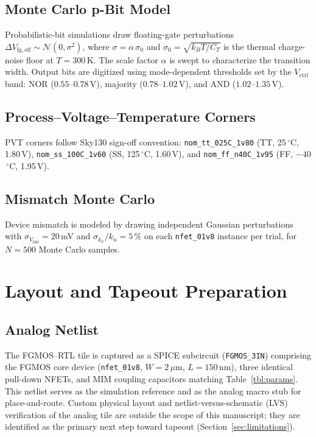\documentclass[a4paper,fleqn]{cas-sc}
\newcommand{\Vfgeff}{V_{\mathrm{fg,eff}}}
\newcommand{\Vctrl}{V_{\mathrm{ctrl}}}
\newcommand{\Vth}{V_{\mathrm{th0}}}
\newcommand{\kn}{k_{n}}
\newcommand{\CT}{C_{T}}
\begin{document}
\subsection{Monte Carlo p-Bit Model}

Probabilistic-bit simulations draw floating-gate perturbations
$\Delta\Vfgeff \sim \mathcal{N}(0,\sigma^2)$, where $\sigma = \alpha\,\sigma_0$ and
$\sigma_0 = \sqrt{k_B T / \CT}$ is the thermal charge-noise floor at $T = 300$\,K.
The scale factor $\alpha$ is swept to characterize the transition width. Output bits
are digitized using mode-dependent thresholds set by the $\Vctrl$ band:
NOR ($0.55$--$0.78$\,V), majority ($0.78$--$1.02$\,V), and AND ($1.02$--$1.35$\,V).

\subsection{Process--Voltage--Temperature Corners}

PVT corners follow Sky130 sign-off convention:
\texttt{nom\_tt\_025C\_1v80} (TT, 25\,$^\circ$C, 1.80\,V),
\texttt{nom\_ss\_100C\_1v60} (SS, 125\,$^\circ$C, 1.60\,V), and
\texttt{nom\_ff\_n40C\_1v95} (FF, $-40$\,$^\circ$C, 1.95\,V).

\subsection{Mismatch Monte Carlo}

Device mismatch is modeled by drawing independent Gaussian perturbations with
$\sigma_{\Vth} = 20$\,mV and $\sigma_{\kn}/\kn = 5\,\%$ on each
\texttt{nfet\_01v8} instance per trial, for $N = 500$ Monte Carlo samples.

\section{Layout and Tapeout Preparation}
\label{sec:layout}

\subsection{Analog Netlist}

The FGMOS--RTL tile is captured as a SPICE subcircuit (\texttt{FGMOS\_3IN}) comprising
the FGMOS core device (\texttt{nfet\_01v8}, $W = 2\,\mu$m, $L = 150$\,nm), three
identical pull-down NFETs, and MIM coupling capacitors matching Table~\ref{tbl:params}.
This netlist serves as the simulation reference and as the analog macro stub for
place-and-route. Custom physical layout and netlist-versus-schematic (LVS) verification
of the analog tile are outside the scope of this manuscript; they are identified as the
primary next step toward tapeout (Section~\ref{sec:limitations}).
\end{document}
